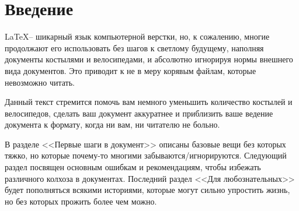 \section*{Введение}


\LaTeX -- шикарный язык компьютерной верстки, но, к сожалению, многие продолжают его использовать без шагов к светлому будущему, наполняя документы костылями и велосипедами, и абсолютно игнорируя нормы внешнего вида документов. Это приводит к не в меру корявым файлам, которые невозможно читать. 

Данный текст стремится помочь вам немного уменьшить количество костылей и велосипедов, сделать ваш документ аккуратнее и приблизить ваше ведение документа к формату, когда ни вам, ни читателю не больно. 

В разделе <<Первые шаги в документ>> описаны базовые вещи без которых тяжко, но которые почему-то многими забываются/игнорируются. Следующий раздел посвящен основным ошибкам и рекомендациям, чтобы избежать  различного колхоза в документах. Последний раздел <<Для любознательных>> будет пополняться всякими историями, которые могут сильно упростить жизнь, но без которых прожить более чем можно. 



